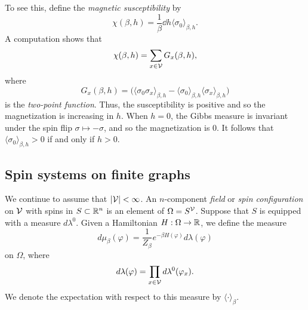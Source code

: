 To see this, define the \emph{magnetic susceptibility} by
\begin{equation}
\chi(\beta, h)
	=
\frac{1}{\beta} \dd{}{h} \langle \sigma_0 \rangle_{\beta,h}.
\end{equation}
A computation shows that
\begin{equation}
\chi(\beta, h) = \sum_{x\in\mathcal{V}} G_x(\beta, h),
\end{equation}
where
\begin{equation}
G_x(\beta, h)
	=
\Big(
	\langle \sigma_0 \sigma_x \rangle_{\beta,h}
		-
	\langle \sigma_0 \rangle_{\beta,h} \langle \sigma_x \rangle_{\beta,h}
\Big)
\end{equation}
is the \emph{two-point function}.
Thus, the susceptibility is positive and so the magnetization is increasing
in $h$. When $h = 0$, the Gibbs measure is invariant under the spin flip
$\sigma \mapsto -\sigma$, and so the magnetization is $0$. It follows that
$\langle \sigma_0 \rangle_{\beta,h} > 0$ if and only if $h > 0$.


\subsection{Spin systems on finite graphs}

We continue to assume that $|\mathcal{V}| < \infty$.
An $n$-component \emph{field} or \emph{spin configuration} on $\mathcal{V}$
with spins in $S \subset {\mathbb R}^n$ is an element of $\Omega = S^{\mathcal{V}}$.
Suppose that $S$ is equipped with a measure $d\lambda^0$.
Given a Hamiltonian $H : \Omega \rightarrow {\mathbb R}$, we define the measure
\begin{equation}
d\mu_\beta(\varphi)
  =
\frac{1}{Z_\beta} e^{-\beta H(\varphi)} d\lambda(\varphi)
\end{equation}
on $\Omega$, where
\begin{equation}
d\lambda(\varphi) = \prod_{x\in\mathcal{V}} d\lambda^0(\varphi_x).
\end{equation}
We denote the expectation with respect to this measure by $\langle\cdot\rangle_\beta$.
% 


